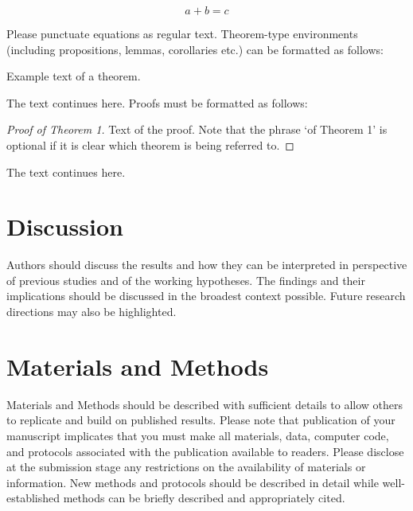\documentclass[hydrology,article,submit,moreauthors,pdftex]{Definitions/mdpi}
\begin{document}
\begin{equation}
a + b = c
\end{equation}

Please punctuate equations as regular text. Theorem-type environments (including propositions, lemmas, corollaries etc.) can be formatted as follows:
\begin{Theorem}
Example text of a theorem.
\end{Theorem}

The text continues here. Proofs must be formatted as follows:

\begin{proof}[Proof of Theorem 1]
Text of the proof. Note that the phrase `of Theorem 1' is optional if it is clear which theorem is being referred to.
\end{proof}
The text continues here.

\section{Discussion}

Authors should discuss the results and how they can be interpreted in perspective of previous studies and of the working hypotheses. The findings and their implications should be discussed in the broadest context possible. Future research directions may also be highlighted.

\section{Materials and Methods}

Materials and Methods should be described with sufficient details to allow others to replicate and build on published results. Please note that publication of your manuscript implicates that you must make all materials, data, computer code, and protocols associated with the publication available to readers. Please disclose at the submission stage any restrictions on the availability of materials or information. New methods and protocols should be described in detail while well-established methods can be briefly described and appropriately cited.
\end{document}
